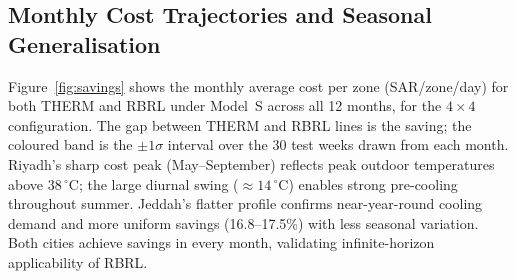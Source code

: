 \documentclass[3p,number]{elsarticle}
\let\oldsubsection\subsection
\renewcommand{\subsection}{\FloatBarrier\oldsubsection}
\begin{document}
\subsection{Monthly Cost Trajectories and Seasonal Generalisation}
\label{subsec:seasonal}
 
Figure~\ref{fig:savings} shows the monthly average cost per zone (SAR/zone/day) for both THERM and RBRL under Model~S across all 12 months, for the $4\times4$ configuration.
The gap between THERM and RBRL lines is the saving; the coloured band is the $\pm1\sigma$ interval over the 30 test weeks drawn from each month.
Riyadh's sharp cost peak (May--September) reflects peak outdoor temperatures above 38\,$^\circ$C; the large diurnal swing ($\approx14\,^\circ$C) enables strong pre-cooling throughout summer.
Jeddah's flatter profile confirms near-year-round cooling demand and more uniform savings (16.8--17.5\%) with less seasonal variation.
Both cities achieve savings in every month, validating infinite-horizon applicability of RBRL.
 
\end{document}
